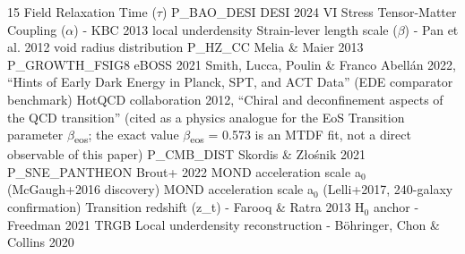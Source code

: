 \documentclass[11pt,a4paper]{article}
\begin{document}
{\scriptsize
\begin{thebibliography}{15}
 \texttt{{\small\protect{}}} Field Relaxation Time ($\tau$)
 \texttt{{\small\protect{}}} P\_\allowbreak{}BAO\_\allowbreak{}DESI DESI 2024 VI
 \texttt{{\small\protect{}}} Stress Tensor-Matter Coupling ($\alpha$) - KBC 2013 local underdensity
 \texttt{{\small\protect{}}} Strain-lever length scale ($\beta$) - Pan et al. 2012 void radius distribution
 \texttt{{\small\protect{}}} P\_\allowbreak{}HZ\_\allowbreak{}CC Melia \& Maier 2013
 \texttt{{\small\protect{}}} P\_\allowbreak{}GROWTH\_\allowbreak{}FSIG8 eBOSS 2021
 \texttt{{\small\protect{}}} Smith, Lucca, Poulin \& Franco Abell\'an 2022, ``Hints of Early Dark Energy in Planck, SPT, and ACT Data'' (EDE comparator benchmark)
 \texttt{{\small\protect{}}} HotQCD collaboration 2012, ``Chiral and deconfinement aspects of the QCD transition'' (cited as a physics analogue for the EoS Transition parameter $\beta$\textsubscript{eos}; the exact value $\beta$\textsubscript{eos} = 0.573 is an MTDF fit, not a direct observable of this paper)
 \texttt{{\small\protect{}}} P\_\allowbreak{}CMB\_\allowbreak{}DIST Skordis \& Z\l{}o\'snik 2021
 \texttt{{\small\protect{}}} P\_\allowbreak{}SNE\_\allowbreak{}PANTHEON Brout+ 2022
 \texttt{{\small\protect{}}} MOND acceleration scale a$_{0}$ (McGaugh+2016 discovery)
 \texttt{{\small\protect{}}} MOND acceleration scale a$_{0}$ (Lelli+2017, 240-galaxy confirmation)
 \texttt{{\small\protect{}}} Transition redshift (z\_\allowbreak{}t) - Farooq \& Ratra 2013
 \texttt{{\small\protect{}}} H$_{0}$ anchor - Freedman 2021 TRGB
 \texttt{{\small\protect{}}} Local underdensity reconstruction - B\"ohringer, Chon \& Collins 2020
\end{thebibliography}
}
\end{document}
